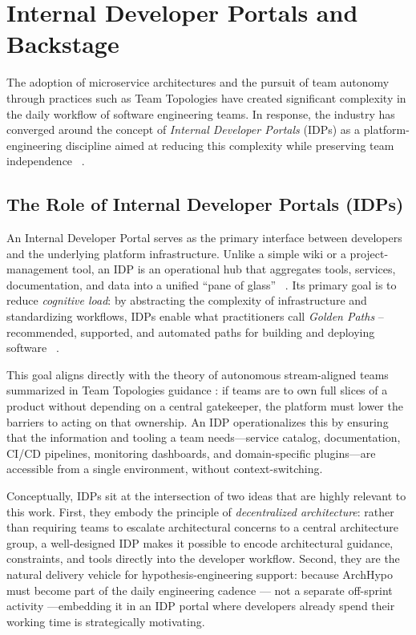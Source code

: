 \section{Internal Developer Portals and Backstage}
\label{sec:idp-backstage}

The adoption of microservice architectures and the pursuit of team autonomy through
practices such as Team Topologies have created significant complexity in the daily
workflow of software engineering teams. In response, the industry has converged around the
concept of \emph{Internal Developer Portals} (IDPs) as a platform-engineering
discipline aimed at reducing this complexity while preserving team
independence ~\citep{correa2025}.

\subsection{The Role of Internal Developer Portals (IDPs)}
\label{subsec:idp-role}

An Internal Developer Portal serves as the primary interface between developers and the
underlying platform infrastructure. Unlike a simple wiki or a project-management tool,
an IDP is an operational hub that aggregates tools, services, documentation, and data
into a unified ``pane of glass'' ~\citep{correa2025}. Its primary goal is to reduce
\emph{cognitive load}: by abstracting the complexity of infrastructure and standardizing
workflows, IDPs enable what practitioners call \emph{Golden Paths} -- recommended,
supported, and automated paths for building and deploying software ~\citep{correa2025}.

This goal aligns directly with the theory of autonomous stream-aligned teams summarized in Team Topologies guidance \citep{skelton2019}: if teams are to own full slices of a product
without depending on a central gatekeeper, the platform must lower the barriers to
acting on that ownership. An IDP operationalizes this by ensuring that the information
and tooling a team needs—service catalog, documentation, CI/CD pipelines, monitoring
dashboards, and domain-specific plugins—are accessible from a single environment,
without context-switching.

Conceptually, IDPs sit at the intersection of two ideas that are highly relevant to this
work. First, they embody the principle of \emph{decentralized architecture}: rather
than requiring teams to escalate architectural concerns to a central architecture group,
a well-designed IDP makes it possible to encode architectural guidance, constraints, and
tools directly into the developer workflow. Second, they are the natural delivery vehicle
for hypothesis-engineering support: because ArchHypo must become part of the daily
engineering cadence --- not a separate off-sprint activity ---embedding it in an IDP portal where
developers already spend their working time is strategically motivating.

